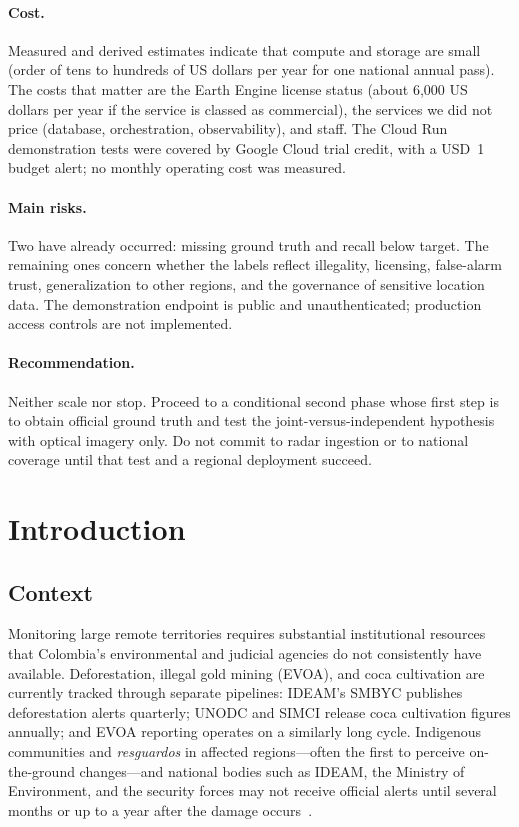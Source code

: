 \documentclass{article}
\begin{document}
\paragraph{Cost.}
Measured and derived estimates indicate that compute and storage are small
(order of tens to hundreds of US dollars per year for one national annual
pass). The costs that matter are the Earth Engine license status
(about 6{,}000 US dollars per year if the service is classed as commercial),
the services we did not price (database, orchestration, observability), and
staff. The Cloud Run demonstration tests were covered by Google Cloud trial credit, with a USD~1 budget alert; no monthly operating cost was measured.

\paragraph{Main risks.}
Two have already occurred: missing ground truth and recall below target.
The remaining ones concern whether the labels reflect illegality, licensing,
false-alarm trust, generalization to other regions, and the governance of
sensitive location data. The demonstration endpoint is public and unauthenticated; production access controls are not implemented.

\paragraph{Recommendation.}
Neither scale nor stop. Proceed to a conditional second phase whose first step
is to obtain official ground truth and test the joint-versus-independent
hypothesis with optical imagery only. Do not commit to radar ingestion or to
national coverage until that test and a regional deployment succeed.

\newpage


\section{Introduction}

\subsection{Context}

Monitoring large remote territories requires substantial institutional resources
that Colombia's environmental and judicial agencies do not consistently have
available.
Deforestation, illegal gold mining (EVOA), and coca cultivation are currently
tracked through separate pipelines: IDEAM's SMBYC publishes deforestation alerts
quarterly; UNODC and SIMCI release coca cultivation figures annually; and EVOA
reporting operates on a similarly long cycle.
Indigenous communities and \textit{resguardos} in affected regions---often the
first to perceive on-the-ground changes---and national bodies such as IDEAM, the
Ministry of Environment, and the security forces may not receive official alerts
until several months or up to a year after the damage occurs~\cite{mongabay_siona2023}.
\end{document}
